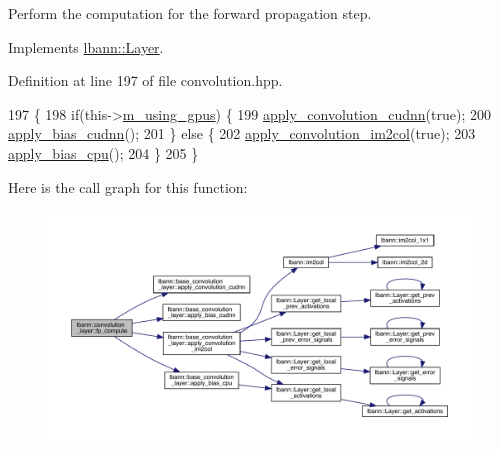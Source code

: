 Perform the computation for the forward propagation step. 

Implements \hyperlink{classlbann_1_1Layer_a523319dd1bd87a0612afa1912bb5aad7}{lbann\+::\+Layer}.



Definition at line 197 of file convolution.\+hpp.


\begin{DoxyCode}
197                              \{
198     \textcolor{keywordflow}{if}(this->\hyperlink{classlbann_1_1Layer_af7881cb5eff5207c15fa835d65462e8f}{m\_using\_gpus}) \{
199       \hyperlink{classlbann_1_1base__convolution__layer_a1c6e967ab0c66cfa0d27f7abfbbf2be8}{apply\_convolution\_cudnn}(\textcolor{keyword}{true});
200       \hyperlink{classlbann_1_1base__convolution__layer_aa33e490222597c4c5203d94061ae9d88}{apply\_bias\_cudnn}();
201     \} \textcolor{keywordflow}{else} \{
202       \hyperlink{classlbann_1_1base__convolution__layer_a0710d46aa54d92f94de920ed37f6ef11}{apply\_convolution\_im2col}(\textcolor{keyword}{true});
203       \hyperlink{classlbann_1_1base__convolution__layer_a4f792e1c19d4591f305880b57f63cec3}{apply\_bias\_cpu}();
204     \}
205   \}
\end{DoxyCode}
Here is the call graph for this function\+:\nopagebreak
\begin{figure}[H]
\begin{center}
\leavevmode
\includegraphics[width=350pt]{classlbann_1_1convolution__layer_aaca2c840fe41d8025efce91d6e9211b9_cgraph}
\end{center}
\end{figure}
\mbox{\label{classlbann_1_1convolution__layer_a496e4bc7465269961603aba305700b84}} 
